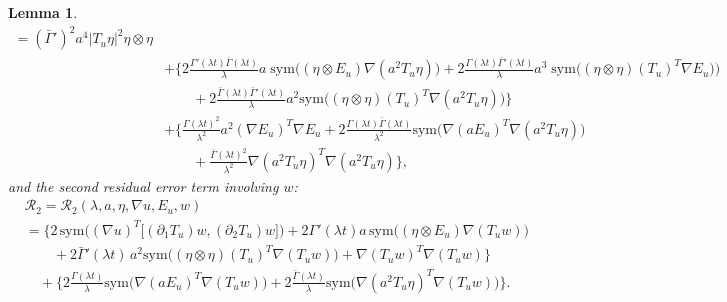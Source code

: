 \documentclass[reqno,twoside,11pt]{amsart}
\newcommand{\sym}{\mathrm{sym}}
\numberwithin{equation}{section}
\theoremstyle{plain}
\newtheorem{lemma}[theorem]{Lemma}
\theoremstyle{definition}
\begin{document}
\begin{lemma}
\begin{equation*}
\begin{split}
= (\bar\Gamma')^2a^4 |T_u\eta|^2\eta\otimes\eta 
\\ & + \Big\{ 2\frac{\Gamma'(\lambda t)\bar\Gamma(\lambda
  t)}{\lambda} a \;\sym\big((\eta\otimes E_u)\nabla(a^2T_u\eta)\big)
+ 2\frac{\Gamma(\lambda t)\bar\Gamma'(\lambda t)}{\lambda} a^3 
\;\sym\big((\eta\otimes\eta) (T_u)^T\nabla E_u)\big)
\\ & \qquad  + 2\frac{\bar\Gamma(\lambda t)\bar\Gamma'(\lambda t)}{\lambda}
a^2\sym\big((\eta\otimes \eta) (T_u)^T\nabla(a^2 T_u\eta)\big)\Big\}
\\ & +\Big\{ \frac{\Gamma(\lambda t)^2}{\lambda^2}a^2 (\nabla E_u)^T\nabla E_u
+ 2 \frac{\Gamma(\lambda t)\bar\Gamma(\lambda t)}{\lambda^2} \sym\big(
\nabla(aE_u)^T\nabla(a^2 T_u\eta)\big) \\ & \qquad +
\frac{\bar\Gamma(\lambda t)^2}{\lambda^2} \nabla(a^2
T_u\eta)^T\nabla(a^2 T_u\eta) \Big\}, 
\end{split}
\end{equation*}
and the second residual error term involving $w$:
\begin{equation*}
\begin{split}
& \mathcal{R}_2= \mathcal{R}_2(\lambda, a, \eta, \nabla u, E_u, w) \\ &
= \Big\{2\,\sym\big((\nabla u)^T\big[(\partial_1 T_u)w, (\partial_2 T_u)w\big]\big)+ 
2\Gamma'(\lambda t) a\,\sym\big((\eta\otimes E_u)\nabla(T_u w)\big)
\\ & \qquad + 2\bar\Gamma'(\lambda t)\, a^2\sym\big((\eta\otimes\eta) (T_u)^T\nabla
(T_u w)\big) + \nabla (T_u w)^T\nabla (T_uw) \Big\} \\ & \quad + \Big\{ 2\frac{\Gamma(\lambda
  t)}{\lambda} \sym\big(\nabla (a E_u)^T\nabla (T_u w)\big)
+2\frac{\bar\Gamma(\lambda t)}{\lambda}\sym\big(\nabla (a^2 T_u
\eta)^T\nabla (T_u w)\big)\Big\}.
\end{split}
\end{equation*}
\end{lemma}
\end{document}
